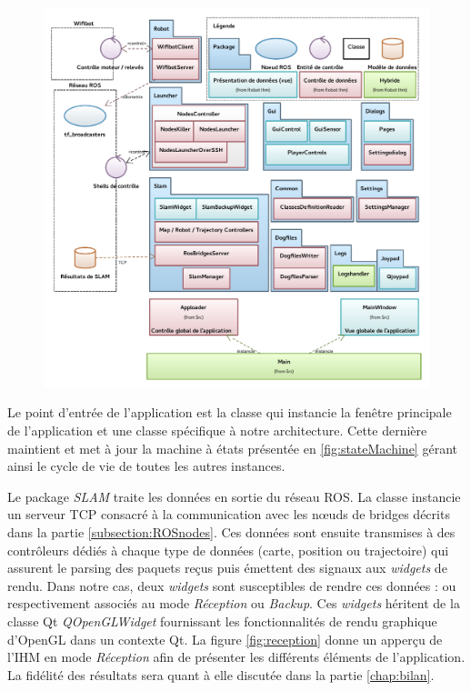 \begin{figure}[h]
  \centering
    \includegraphics[width=1.\linewidth]{figures/ihm-model}  
  \label{fig:modelIHM}
\end{figure}

Le point d'entrée de l'application est la classe  qui instancie la fenêtre principale de l'application \cite{Bib_qmainwindow} et une classe  spécifique à notre architecture.
Cette dernière maintient et met à jour la machine à états présentée en \ref{fig:stateMachine} gérant ainsi le cycle de vie de toutes les autres instances.  

Le package \emph{SLAM} traite les données en sortie du réseau \gls{ROS}. 
La classe  instancie un serveur \gls{TCP} consacré à la communication avec les n\oe{}uds de bridges décrits dans la partie \ref{subsection:ROSnodes}. 
Ces données sont ensuite transmises à des contrôleurs dédiés à chaque type de données (carte, position ou trajectoire) qui assurent le parsing des paquets reçus puis émettent des signaux aux \emph{widgets} de rendu. 
Dans notre cas, deux \emph{widgets} sont susceptibles de rendre ces données :  ou  respectivement associés au mode \emph{Réception} ou \emph{Backup}.
Ces \emph{widgets} héritent de la classe Qt \emph{QOpenGLWidget} fournissant les fonctionnalités de rendu graphique d'OpenGL dans un contexte Qt. 
La figure \ref{fig:reception} donne un apperçu de l'\gls{IHM} en mode \emph{Réception} afin de présenter les différents éléments de l'application. 
La fidélité des résultats sera quant à elle discutée dans la partie \ref{chap:bilan}.  


